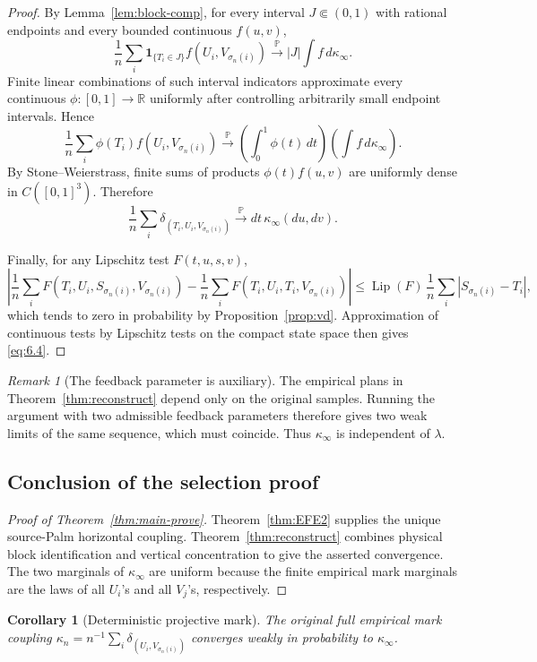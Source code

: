 \documentclass[11pt,reqno]{amsart}
\newtheorem{corollary}[theorem]{Corollary}
\theoremstyle{definition}
\theoremstyle{remark}
\newtheorem{remark}[theorem]{Remark}
\numberwithin{equation}{section}
\newcommand{\R}{\mathbb R}
\newcommand{\Pp}{\mathbb P}
\newcommand{\Lip}{\operatorname{Lip}}
\begin{document}
\begin{proof}
By Lemma~\ref{lem:block-comp}, for every interval
\(J\Subset(0,1)\) with rational endpoints and every bounded continuous
\(f(u,v)\),
\begin{equation}
\frac1n\sum_i
\mathbf 1_{\{T_i\in J\}}f(U_i,V_{\sigma_n(i)})
\xrightarrow{\Pp}
|J|\int f\,d\kappa_\infty .
\label{eq:6.5}
\end{equation}
Finite linear combinations of such interval indicators approximate every
continuous \(\phi:[0,1]\to\R\) uniformly after controlling arbitrarily
small endpoint intervals.  Hence
\begin{equation}
\frac1n\sum_i
\phi(T_i)f(U_i,V_{\sigma_n(i)})
\xrightarrow{\Pp}
\left(\int_0^1\phi(t)\,dt\right)
\left(\int f\,d\kappa_\infty\right).
\label{eq:6.6}
\end{equation}
By Stone--Weierstrass, finite sums of products
\(\phi(t)f(u,v)\) are uniformly dense in
\(C([0,1]^3)\).  Therefore
\begin{equation}
\frac1n\sum_i
\delta_{(T_i,U_i,V_{\sigma_n(i)})}
\xrightarrow{\Pp}
dt\,\kappa_\infty(du,dv).
\label{eq:6.7}
\end{equation}

Finally, for any Lipschitz test
\(F(t,u,s,v)\),
\[
\left|
\frac1n\sum_i
F(T_i,U_i,S_{\sigma_n(i)},V_{\sigma_n(i)})
-
\frac1n\sum_i
F(T_i,U_i,T_i,V_{\sigma_n(i)})
\right|
\le
\Lip(F)\,
\frac1n\sum_i|S_{\sigma_n(i)}-T_i|,
\]
which tends to zero in probability by Proposition~\ref{prop:vd}.  Approximation of continuous
tests by Lipschitz tests on the compact state space then gives \eqref{eq:6.4}.
\end{proof}

\begin{remark}[The feedback parameter is auxiliary]
The empirical plans in Theorem~\ref{thm:reconstruct} depend only on the
original samples.  Running the argument with two admissible feedback
parameters therefore gives two weak limits of the same sequence, which
must coincide.  Thus \(\kappa_\infty\) is independent of \(\lambda\).
\end{remark}

\subsection{Conclusion of the selection proof}

\begin{proof}[Proof of Theorem~\ref{thm:main-prove}]
Theorem~\ref{thm:EFE2} supplies the unique source-Palm horizontal coupling.
Theorem~\ref{thm:reconstruct} combines physical block identification and
vertical concentration to give the asserted convergence.
The two marginals of \(\kappa_\infty\)
are uniform because the finite empirical mark marginals are the laws
of all \(U_i\)'s and all \(V_j\)'s, respectively.
\end{proof}
\begin{corollary}[Deterministic projective mark]
\label{cor:deterministic-mark-prove}
The original full empirical mark coupling
\(\kappa_n=n^{-1}\sum_i\delta_{(U_i,V_{\sigma_n(i)})}\)
converges weakly in probability to \(\kappa_\infty\).
\end{corollary}
\end{document}
